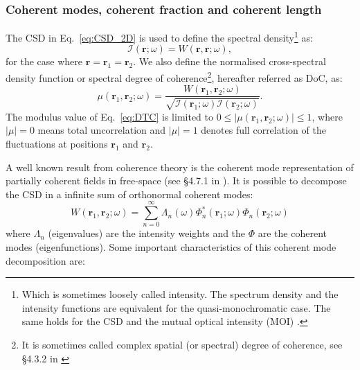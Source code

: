 \documentclass{iucr}              %
\newcommand{\inblue}[1]{{\color{blue}#1}}
\begin{document}
\subsubsection{Coherent modes, coherent fraction and coherent length\\}

The CSD in Eq.~\ref{eq:CSD_2D} is used to define the spectral density\footnote{Which is sometimes loosely called intensity. The spectrum density and the intensity functions are equivalent for the quasi-monochromatic case. The same holds for the CSD and the mutual optical intensity (MOI) \cite{mandel_wolf}.} as:
\begin{equation}\label{eq:intensity}
    \mathcal{I}(\textbf{r};\omega)=W(\textbf{r},\textbf{r};\omega),
\end{equation}
for the case where $\textbf{r}=\textbf{r}_1=\textbf{r}_2$. We also define the normalised cross-spectral density function or spectral degree of coherence\footnote{It is sometimes called complex spatial (or spectral) degree of coherence, see §4.3.2 in \cite{mandel_wolf}}, \inblue{hereafter referred as DoC}, as:
\begin{equation}
\mu(\textbf{r}_1,\textbf{r}_2;\omega) = \frac{W(\textbf{r}_1,\textbf{r}_2;\omega)}{\sqrt{\mathcal{I}(\textbf{r}_1;\omega) \mathcal{I}(\textbf{r}_2;\omega)}}.
\label{eq:DTC}
\end{equation}
The modulus value of Eq.~\ref{eq:DTC} is limited to $0\leq|\mu(\textbf{r}_1,\textbf{r}_2;\omega)|\leq 1$, where $|\mu|=0$ means total uncorrelation and $|\mu|=1$ denotes full correlation of the fluctuations at positions $\textbf{r}_1$ and $\textbf{r}_2$.

A well known result from coherence theory is the coherent mode representation of partially coherent fields in free-space (see §4.7.1 in \cite{mandel_wolf}). It is possible to decompose the CSD in a infinite sum of orthonormal coherent modes:
\begin{equation}\label{eq:W2DCMD}
W(\textbf{r}_1,\textbf{r}_2;\omega) = \sum_{n=0}^{\infty} \Lambda_n(\omega) \Phi_{n}^*(\textbf{r}_1;\omega) \Phi_{n}(\textbf{r}_2;\omega)
\end{equation}
where $\Lambda_n$ (eigenvalues) are the intensity weights and the $\Phi$ are the coherent modes (eigenfunctions). 
Some important characteristics of this coherent mode decomposition are: 
\end{document}
